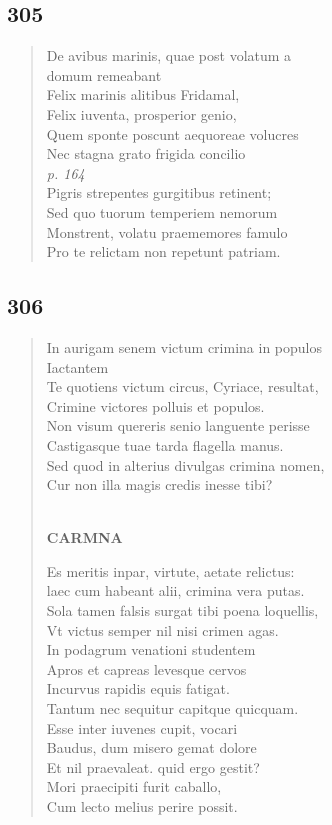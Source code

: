 \documentclass[11pt, a4paper]{report}
\begin{document}
            \subsection*{305}
      \begin{verse}
      De avibus marinis, quae post volatum a \\ domum remeabant \\ Felix marinis alitibus Fridamal, \\ Felix iuventa, prosperior genio, \\ Quem sponte poscunt aequoreae volucres \\ Nec stagna grato frigida concilio \\ \textit{p. 164} \\ Pigris strepentes gurgitibus retinent; \\ Sed quo tuorum temperiem nemorum \\ Monstrent, volatu praememores famulo \\ Pro te relictam non repetunt patriam. \\ 
      \end{verse}
  
            \subsection*{306}
      \begin{verse}
      In aurigam senem victum crimina in populos \\ Iactantem \\ Te quotiens victum circus, Cyriace, resultat, \\ Crimine victores polluis et populos. \\ Non visum quereris senio languente perisse \\ Castigasque tuae tarda flagella manus. \\ Sed quod in alterius divulgas crimina nomen, \\ Cur non illa magis credis inesse tibi? \\ 
        ﻿\pagebreak 
    \begin{center} \textbf{CARMNA} \end{center} \marginpar{[258]} Es meritis inpar, virtute, aetate relictus: \\ laec cum habeant alii, crimina vera putas. \\ Sola tamen falsis surgat tibi poena loquellis, \\ Vt victus semper nil nisi crimen agas. \\ In podagrum venationi studentem \\ Apros et capreas levesque cervos \\ Incurvus rapidis equis fatigat. \\ Tantum nec sequitur capitque quicquam. \\ Esse inter iuvenes cupit, vocari \\ Baudus, dum misero gemat dolore \\ Et nil praevaleat. quid ergo gestit? \\ Mori praecipiti furit caballo, \\ Cum lecto melius perire possit. \\ 
      \end{verse}
  
\end{document}
